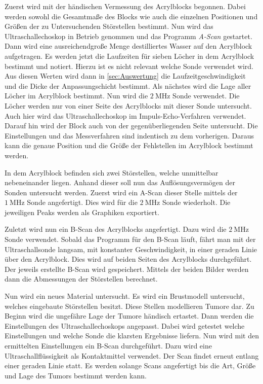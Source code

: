 Zuerst wird mit der händischen Vermessung des Acrylblocks begonnen. Dabei werden sowohl die Gesamtmaße des Blocks wie auch die einzelnen Positionen und Größen der zu 
Untersuchenden Störstellen bestimmt. Nun wird das Ultraschallechoskop in Betrieb genommen und das Programm \textit{A-Scan} gestartet. Dann wird eine ausreichendgroße Menge destilliertes
Wasser auf den Acrylblock aufgetragen. Es werden jetzt die Laufzeiten für sieben Löcher in dem Acrylblock bestimmt und notiert. Hierzu ist es nicht relevant welche Sonde verwendet wird.
Aus diesen Werten wird dann in \autoref{sec:Auswertung} die Laufzeitgeschwindigkeit und die Dicke der Anpassungschicht bestimmt. Als nächstes wird die Lage aller Löcher im Acrylblock
bestimmt. Nun wird die $\qty{2}{\mega\hertz}$ Sonde verwendet. Die Löcher werden nur von einer Seite des Acrylblocks mit dieser Sonde untersucht. Auch hier wird das Ultraschallechoskop 
im Impuls-Echo-Verfahren verwendet. 
Darauf hin wird der Block auch von der gegenüberliegenden Seite untersucht. Die Einstellungen und das Messverfahren sind indentisch zu dem vorherigen. Daraus kann die genaue
Position und die Größe der Fehlstellen im Acrylblock bestimmt werden.

In dem Acrylblock befinden sich zwei Störstellen, welche unmittelbar nebeneinander liegen. Anhand dieser soll nun das Auflösungsvermögen der Sonden untersucht werden. Zuerst wird 
ein A-Scan dieser Stelle mittels der $\qty{1}{\mega\hertz}$ Sonde angefertigt. Dies wird für die $\qty{2}{\mega\hertz}$ Sonde wiederholt. Die jeweiligen Peaks werden als Graphiken
exportiert.

Zuletzt wird nun ein B-Scan des Acrylblocks angefertigt. Dazu wird die $\qty{2}{\mega\hertz}$ Sonde verwendet. Sobald das Programm für den B-Scan läuft, fährt man mit der Ultraschallsonde
langsam, mit konstanter Geschwindigkeit, in einer geraden Linie über den Acrylblock. Dies wird auf beiden Seiten des Acrylblocks durchgeführt. Der jeweils erstellte B-Scan wird gespeichert.
Mittels der beiden Bilder werden dann die Abmessungen der Störstellen berechnet. 

Nun wird ein neues Material untersucht. Es wird ein Brustmodell untersucht, welches eingebaute Störstellen besitzt. Diese Stellen modellieren Tumore dar. Zu Beginn wird die ungefähre Lage der 
Tumore händisch ertastet. Dann werden die Einstellungen des Ultraschallechoskops angepasst. Dabei wird getestet welche Einstellungen und welche Sonde die klarsten Ergebnisse liefern.
Nun wird mit den ermittelten Einstellungen ein B-Scan durchgeführt. Dazu wird eine Ultraschallflüssigkeit als Kontaktmittel verwendet. Der Scan findet erneut entlang einer geraden 
Linie statt. Es werden solange Scans angefertigt bis die Art, Größe und Lage des Tumors bestimmt werden kann.